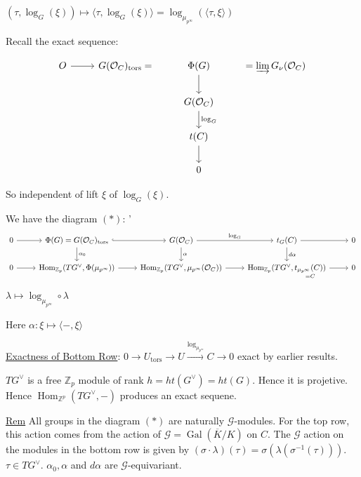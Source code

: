\documentclass{article}
\theoremstyle{definition}
\numberwithin{theorem}{subsection}
\begin{document}
    \((\tau,\log_G(\xi)) \mapsto \langle \tau , \log_G(\xi) \rangle = \log_{\mu_{p^{\infty}}}(\langle \tau , \xi \rangle)\) 

    Recall the exact sequence:

    \[
        \begin{tikzcd}
            O \ar[r] & G(\mathcal{O}_C)_{\text{tors}} = & \Phi(G) \ar[d] & = \varinjlim G_\nu(\mathcal{O}_C) \\ & & G(\mathcal{O}_C) \ar[d,"\log_G"] \\ & & t(C) \ar[d] \\ & & 0
        \end{tikzcd}
    \]

    So independent of lift \(\xi\) of \(\log_G(\xi)\).

    We have the diagram \((\ast)\):
    ' 
    \[
        \begin{tikzcd}
            0 \ar[r] & \Phi(G) = G(\mathcal{O}_C)_{\text{tors}} \ar[d,"\alpha_0"] \ar[r, hook] & G(\mathcal{O}_C) \ar[r,"\log_G"] \ar[d,"\alpha"] & t_G(C) \ar[r] \ar[d,"d \alpha"] & 0 \\
            0 \ar[r] & \operatorname{Hom}_{\mathbb{Z}_p}(TG^\vee, \Phi(\mu_{p^{\infty}})) \ar[r] & \operatorname{Hom}_{\mathbb{Z}_p}(TG^\vee, \mu_{p^{\infty}}(\mathcal{O}_C)) \ar[r] & \operatorname{Hom}_{\mathbb{Z}_p}(TG^\vee,\underset{=C}{t_{\mu_{p^{\infty}}}(C))} \ar[r] & 0
        \end{tikzcd}
    \]

    \(\lambda \mapsto \log_{\mu_{p^{\infty}}} \circ \lambda\) 

    Here \(\alpha : \xi \mapsto \langle -,\xi \rangle \) 

    \underline{Exactness of Bottom Row}: \(0 \to U_{\text{tors}} \to U \xrightarrow{\log_{\mu_{p^{\infty}}}} C \to 0\) exact by earlier results.
    
    \(TG^\vee\) is a free \(\mathbb{Z}_p\) module of rank \(h = ht(G^\vee)=ht(G)\). Hence it is projetive. Hence \(\operatorname{Hom}_{\mathbb{Z}^p}(TG^\vee,-)\) produces an exact sequene.
    
    \underline{Rem} All groups in the diagram \((\ast)\) are naturally \(\mathscr{G}\)-modules. For the top row, this action comes from the action of \(\mathscr{G} = \operatorname{Gal}(\overline{K} / K)\) on \(C\). The \(\mathscr{G}\) action on the modules in the bottom row is given by \((\sigma \cdot \lambda)(\tau) = \sigma (\lambda (\sigma ^{-1} (\tau )))\). \(\tau \in TG^\vee\). \(\alpha_0, \alpha\) and \(d \alpha\) are \(\mathscr{G}\)-equivariant.
\end{document}
